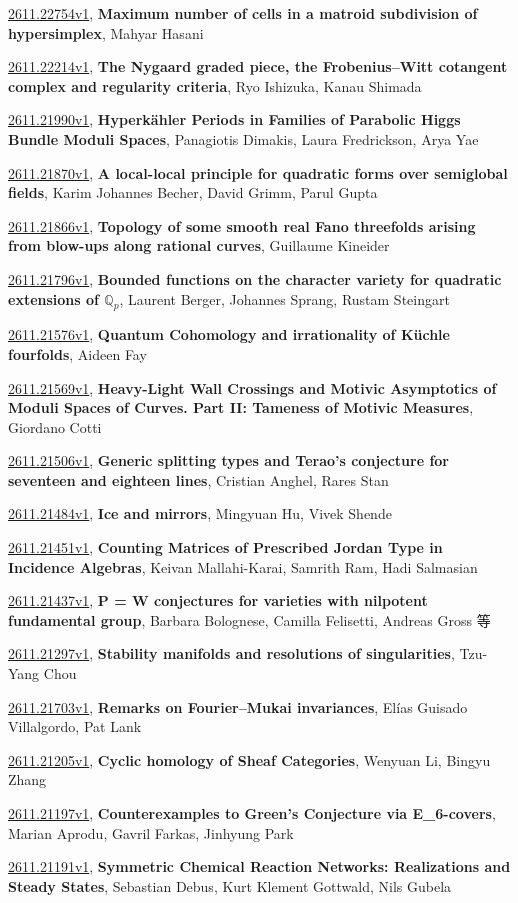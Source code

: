 \documentclass[9pt, a4paper]{article}
\theoremstyle{plain}
\theoremstyle{definition}
\theoremstyle{remark}
\newcommand{\arxiv}[3]{\href{https://arxiv.org/abs/#1}{#1}, \textbf{\textcolor{arxivblue}{#2}}, #3}
\begin{document}
\arxiv{2611.22754v1}{Maximum number of cells in a matroid subdivision of hypersimplex}{Mahyar Hasani}

\arxiv{2611.22214v1}{The Nygaard graded piece, the Frobenius--Witt cotangent complex and regularity criteria}{Ryo Ishizuka, Kanau Shimada}

\arxiv{2611.21990v1}{Hyperkähler Periods in Families of Parabolic Higgs Bundle Moduli Spaces}{Panagiotis Dimakis, Laura Fredrickson, Arya Yae}

\arxiv{2611.21870v1}{A local-local principle for quadratic forms over semiglobal fields}{Karim Johannes Becher, David Grimm, Parul Gupta}

\arxiv{2611.21866v1}{Topology of some smooth real Fano threefolds arising from blow-ups along rational curves}{Guillaume Kineider}

\arxiv{2611.21796v1}{Bounded functions on the character variety for quadratic extensions of $\mathbb{Q}_p$}{Laurent Berger, Johannes Sprang, Rustam Steingart}

\arxiv{2611.21576v1}{Quantum Cohomology and irrationality of Küchle fourfolds}{Aideen Fay}

\arxiv{2611.21569v1}{Heavy-Light Wall Crossings and Motivic Asymptotics of Moduli Spaces of Curves. Part II: Tameness of Motivic Measures}{Giordano Cotti}

\arxiv{2611.21506v1}{Generic splitting types and Terao's conjecture for seventeen and eighteen lines}{Cristian Anghel, Rares Stan}

\arxiv{2611.21484v1}{Ice and mirrors}{Mingyuan Hu, Vivek Shende}

\arxiv{2611.21451v1}{Counting Matrices of Prescribed Jordan Type in Incidence Algebras}{Keivan Mallahi-Karai, Samrith Ram, Hadi Salmasian}

\arxiv{2611.21437v1}{P = W conjectures for varieties with nilpotent fundamental group}{Barbara Bolognese, Camilla Felisetti, Andreas Gross 等}

\arxiv{2611.21297v1}{Stability manifolds and resolutions of singularities}{Tzu-Yang Chou}

\arxiv{2611.21703v1}{Remarks on Fourier--Mukai invariances}{Elías Guisado Villalgordo, Pat Lank}

\arxiv{2611.21205v1}{Cyclic homology of Sheaf Categories}{Wenyuan Li, Bingyu Zhang}

\arxiv{2611.21197v1}{Counterexamples to Green's Conjecture via E_6-covers}{Marian Aprodu, Gavril Farkas, Jinhyung Park}

\arxiv{2611.21191v1}{Symmetric Chemical Reaction Networks: Realizations and Steady States}{Sebastian Debus, Kurt Klement Gottwald, Nils Gubela}
\end{document}
